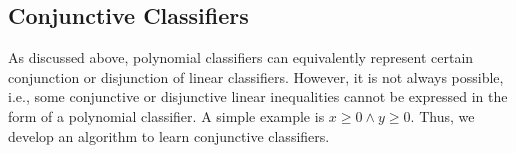 %



\subsection{Conjunctive Classifiers}
As discussed above, polynomial classifiers can equivalently represent certain conjunction or disjunction of linear classifiers. 
However, it is not always possible, i.e., some conjunctive or disjunctive linear inequalities cannot be expressed in the form of a polynomial classifier. 
A simple example is $\mathit{x \ge 0 \land y \ge 0}$. 
Thus, we develop an algorithm to learn conjunctive classifiers.

